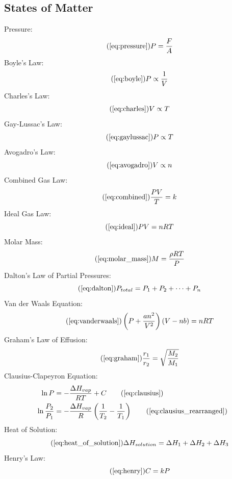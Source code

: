     \subsection{States of Matter}
        Pressure:
        \begin{equation}\tag{\ref{eq:pressure}}
            P = \frac{F}{A}
        \end{equation}
        Boyle's Law:
        \begin{equation}\tag{\ref{eq:boyle}}
            P \propto \frac{1}{V}
        \end{equation}
        Charles's Law:
        \begin{equation}\tag{\ref{eq:charles}}
            V \propto T
        \end{equation}
        Gay-Lussac's Law:
        \begin{equation}\tag{\ref{eq:gaylussac}}
            P \propto T
        \end{equation}
        Avogadro's Law:
        \begin{equation}\tag{\ref{eq:avogadro}}
            V \propto n
        \end{equation}
        Combined Gas Law:
        \begin{equation}\tag{\ref{eq:combined}}
            \frac{PV}{T} = k
        \end{equation}
        Ideal Gas Law:
        \begin{equation}\tag{\ref{eq:ideal}}
            PV = nRT
        \end{equation}
        Molar Mass:
        \begin{equation}\tag{\ref{eq:molar_mass}}
            M = \frac{\rho RT}{P}
        \end{equation}
        Dalton's Law of Partial Pressures:
        \begin{equation}\tag{\ref{eq:dalton}}
            P_{total} = P_1 + P_2 + \dots + P_n
        \end{equation}
        Van der Waals Equation:
        \begin{equation}\tag{\ref{eq:vanderwaals}}
            \left(P + \frac{an^2}{V^2}\right)(V - nb) = nRT
        \end{equation}
        Graham's Law of Effusion:
        \begin{equation}\tag{\ref{eq:graham}}
            \frac{r_1}{r_2} = \sqrt{\frac{M_2}{M_1}}
        \end{equation}
        Clausius-Clapeyron Equation:
        \begin{align}
            \ln P &= -\frac{\Delta H_{vap}}{RT} + C\tag{\ref{eq:clausius}}\\
            \ln \frac{P_2}{P_1} &= -\frac{\Delta H_{vap}}{R}\left(\frac{1}{T_2} - \frac{1}{T_1}\right) \tag{\ref{eq:clausius_rearranged}}
        \end{align}
        Heat of Solution:
        \begin{equation}\tag{\ref{eq:heat_of_solution}}
            \Delta H_{solution} = \Delta H_1 + \Delta H_2 + \Delta H_3
        \end{equation}
        Henry's Law:
        \begin{equation}\tag{\ref{eq:henry}}
            C = kP
        \end{equation}